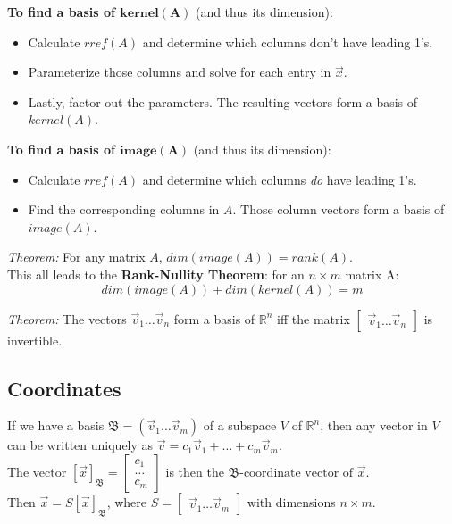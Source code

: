 \documentclass[]{scrartcl}
\begin{document}
	\textbf{To find a basis of $\boldsymbol{kernel(A)}$} (and thus its dimension):
	\begin{itemize}
		\item Calculate $rref(A)$ and determine which columns don't have leading 1's.
		\item Parameterize those columns and solve for each entry in $\vec{x}$.
		\item Lastly, factor out the parameters. The resulting vectors form a basis of $kernel(A)$.
	\end{itemize}

	\textbf{To find a basis of $\boldsymbol{image(A)}$} (and thus its dimension):
	\begin{itemize}
		\item Calculate $rref(A)$ and determine which columns \textit{do} have leading 1's.
		\item Find the corresponding columns in $A$. Those column vectors form a basis of $image(A)$.
	\end{itemize}
	
	\textit{Theorem:} For any matrix $A$, $dim(image(A)) = rank(A)$.\\
	
	This all leads to the \textbf{Rank-Nullity Theorem}: for an $n \times m$ matrix A:
	$$dim(image(A)) + dim(kernel(A)) = m$$
	
	\textit{Theorem:} The vectors $\vec{v}_1 \ldots \vec{v}_n$ form a basis of $\mathbb{R}^n$ iff the matrix $\begin{bmatrix} \vec{v}_1 \ldots \vec{v}_n \end{bmatrix}$ is invertible.
	
	\subsection{Coordinates}
	If we have a basis $\mathfrak{B} = (\vec{v}_1 \ldots \vec{v}_m)$ of a subspace $V$ of $\mathbb{R}^n$, then any vector in $V$ can be written uniquely as $\vec{v} = c_1\vec{v}_1+ \ldots +c_m\vec{v}_m$.\\
	
	The vector $[\vec{x}]_{\mathfrak{B}} = \begin{bmatrix}
		c_1 \\
		\ldots \\
		c_m
	\end{bmatrix}$ is then the $\mathfrak{B} \text{-coordinate vector of } \vec{x}$.\\
	
	Then $\vec{x} = S[\vec{x}]_{\mathfrak{B}}$, where $S = \begin{bmatrix} \vec{v}_1 \ldots \vec{v}_m \end{bmatrix}$ with dimensions $n \times m$.\\
	
\end{document}
